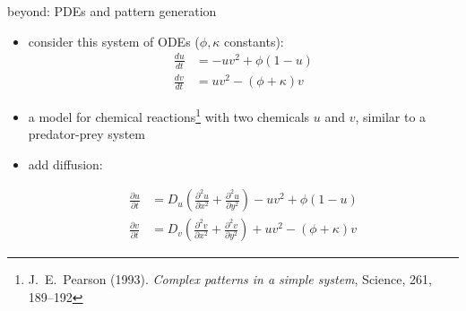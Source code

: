 \documentclass[urlcolor=blue,dvipsnames]{beamer}
\begin{document}
\begin{frame}{beyond: PDEs and pattern generation}

\small
\begin{itemize}
\item consider this system of ODEs ($\phi,\kappa$ constants):
\scriptsize
\begin{align*}
\frac{du}{dt} &= -uv^2+\phi(1-u) \\
\frac{dv}{dt} &= uv^2-(\phi+\kappa)v
\end{align*}
\small
\item a model for chemical reactions\footnote{\tiny J.~E.~Pearson (1993). \emph{Complex patterns in a simple system}, Science, 261, 189--192} with two chemicals $u$ and $v$, similar to a predator-prey system
\item add diffusion:

\vspace{-10mm}
\scriptsize
\begin{align*}
\frac{\partial u}{\partial t} &= D_u \left(\frac{\partial^2 u}{\partial x^2} + \frac{\partial^2 u}{\partial y^2}\right) -uv^2+\phi(1-u) \\
\frac{\partial v}{\partial t} &= D_v \left(\frac{\partial^2 v}{\partial x^2} + \frac{\partial^2 v}{\partial y^2}\right) + uv^2-(\phi+\kappa)v
\end{align*}
\small
\end{itemize}


\end{frame}
\end{document}
